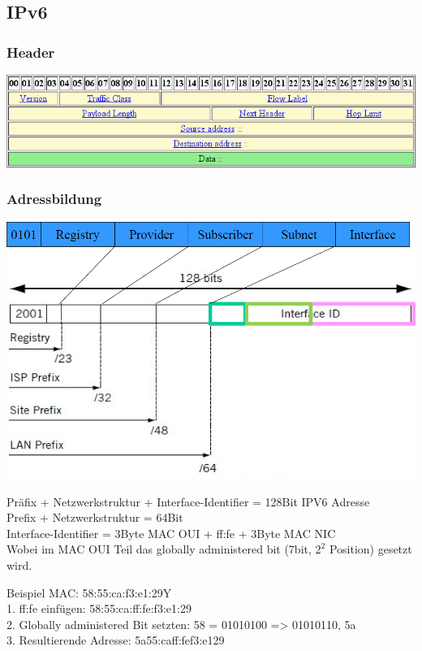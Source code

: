 \subsection{IPv6}

\subsubsection{Header}

\includegraphics[width=\textwidth]{media/ipv6_header.png}

\subsubsection{Adressbildung}

\includegraphics[width=\textwidth]{media/ipv6.png}

Präfix + Netzwerkstruktur + Interface-Identifier = 128Bit IPV6 Adresse\\
Prefix + Netzwerkstruktur = 64Bit\\
Interface-Identifier = 3Byte MAC OUI + ff:fe + 3Byte MAC NIC\\
Wobei im MAC OUI Teil das globally administered bit (7bit, $2^{2}$ Position) gesetzt wird.

Beispiel MAC: 58:55:ca:f3:e1:29Y\\
1. ff:fe einfügen: 58:55:ca:ff:fe:f3:e1:29\\
2. Globally administered Bit setzten: 58 = 01010100 => 01010110, 5a\\
3. Resultierende Adresse: 5a55:caff:fef3:e129


